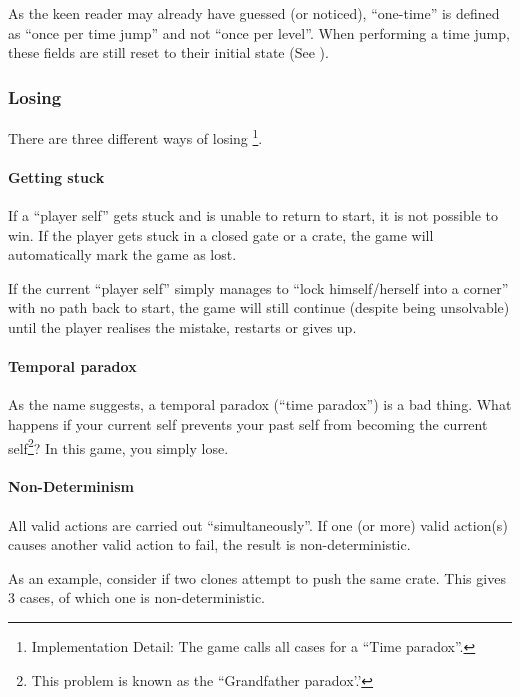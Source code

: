 As the keen reader may already have guessed (or noticed), ``one-time''
is defined as ``once per time jump'' and not ``once per level''.  When
performing a time jump, these fields are still reset to their initial
state (See ).



\subsubsection{Losing}

There are three different ways of losing
\footnote{Implementation Detail: The game calls all cases for a ``Time paradox''.}.

\paragraph{Getting stuck}
If a ``player self'' gets stuck and is unable to return to start, it
is not possible to win.  If the player gets stuck in a closed gate or
a crate, the game will automatically mark the game as lost.

If the current ``player self'' simply manages to ``lock
himself/herself into a corner'' with no path back to start, the game
will still continue (despite being unsolvable) until the player realises
the mistake, restarts or gives up.

\paragraph{Temporal paradox}
\label{temporal-paradox}
As the name suggests, a temporal paradox (``time paradox'') is a bad
thing.  What happens if your current self prevents your past self from
becoming the current self\footnote{This problem is known as the
  ``Grandfather paradox'.'}?  In this game, you simply lose.

\paragraph{Non-Determinism}
All valid actions are carried out ``simultaneously''.  If one (or
more) valid action(s) causes another valid action to fail, the result
is non-deterministic.

As an example, consider if two clones attempt to push the same
crate.  This gives 3 cases, of which one is non-deterministic.

